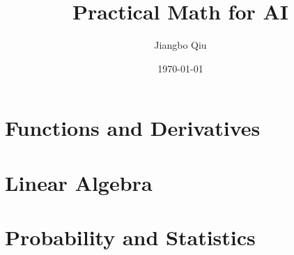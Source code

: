 \documentclass[11pt,openany]{book}
\title{Practical Math for AI}
\author{Jiangbo Qiu}
\date{\today}
\begin{document}
\frontmatter
\maketitle
\tableofcontents



\mainmatter

\part{Functions and Derivatives}



\part{Linear Algebra}



\part{Probability and Statistics}




\backmatter


\end{document}

